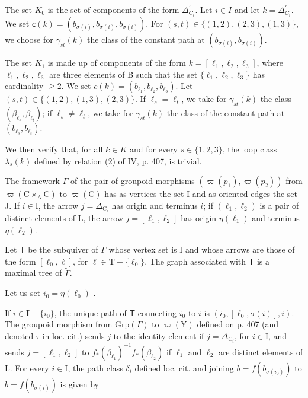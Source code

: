 The set \(K_{0}\) is the set of components of the form \(\Delta_{C_{i}}^{\prime}\). Let \(i \in I\) and let \(k = \Delta_{C_{i}}^{\prime}\). We set \(\mathsf{c}(k) = (b_{\sigma(i)}, b_{\sigma(i)}, b_{\sigma(i)})\). For \((s, t) \in \{(1,2), (2,3), (1,3)\}\), we choose for \(\gamma_{st}(k)\) the class of the constant path at \((b_{\sigma(i)}, b_{\sigma(i)})\).

The set \(K_{1}\) is made up of components of the form \(k = [\ell_{1}, \ell_{2}, \ell_{3}]\), where \(\ell_{1}, \ell_{2}, \ell_{3}\) are three elements of B such that the set \(\{\ell_{1},\ell_{2},\ell_{3}\}\) has cardinality \(\geqslant 2\). We set \(c(k)=(b_{\ell_{1}},b_{\ell_{2}},b_{\ell_{3}})\). Let \((s,t)\in\{(1,2),(1,3),(2,3)\}\). If \(\ell_{s}=\ell_{t}\), we take for \(\gamma_{st}(k)\) the class \((\beta_{\ell_{s}},\beta_{\ell_{t}})\); if \(\ell_{s}\neq\ell_{t}\), we take for \(\gamma_{st}(k)\) the class of the constant path at \((b_{\ell_{s}},b_{\ell_{t}})\).

We then verify that, for all \(k \in K\) and for every \(s \in \{1,2,3\}\), the loop class \(\lambda_{s}(k)\) defined by relation (2) of IV, p. 407, is trivial.

The framework \(\Gamma\) of the pair of groupoid morphisms \((\varpi(p_1), \varpi(p_2))\) from \(\varpi(\mathrm{C} \times_{\mathrm{A}} \mathrm{C})\) to \(\varpi(\mathrm{C})\) has as vertices the set I and as oriented edges the set J. If \(i \in \mathrm{I}\), the arrow \(j = \Delta_{\mathrm{C}_i}\) has origin and terminus \(i\); if \((\ell_1, \ell_2)\) is a pair of distinct elements of L, the arrow \(j = [\ell_1, \ell_2]\) has origin \(\eta(\ell_1)\) and terminus \(\eta(\ell_2)\).

Let \(\mathsf{T}\) be the subquiver of \(\Gamma\) whose vertex set is I and whose arrows are those of the form \([\ell_0,\ell ]\), for \(\ell \in \mathrm{T} - \{\ell_0\}\). The graph associated with \(\mathsf{T}\) is a maximal tree of \(\widetilde{\Gamma}\).

Let us set \(i_0 = \eta (\ell_0)\) .

If \(i \in \mathbf{I} - \{i_0\}\), the unique path of \(\mathsf{T}\) connecting \(i_0\) to \(i\) is \((i_0, [\ell_0, \sigma(i)], i)\). The groupoid morphism from \(\mathrm{Grp}(\Gamma)\) to \(\varpi(\mathrm{Y})\) defined on p. 407 (and denoted \(\tau\) in loc. cit.) sends \(j\) to the identity element if \(j = \Delta_{\mathrm{C}_i}\), for \(i \in \mathrm{I}\), and sends \(j = [\ell_1, \ell_2]\) to \(f_*(\beta_{\ell_1})^{-1}f_*(\beta_{\ell_2})\) if \(\ell_1\) and \(\ell_2\) are distinct elements of L. For every \(i \in \mathrm{I}\), the path class \(\delta_i\) defined loc. cit. and joining \(b = f(b_{\sigma(i_0)})\) to \(b = f(b_{\sigma(i)})\) is given by

